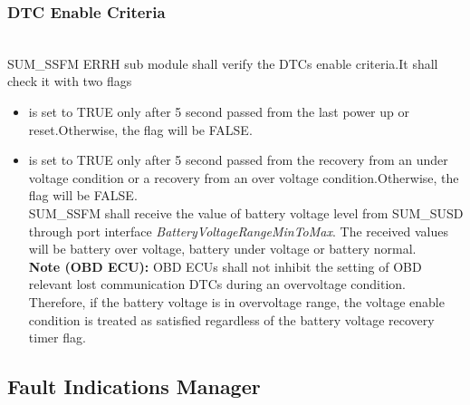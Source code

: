 \subsubsection{DTC Enable Criteria}
\\
\label{sec:DTCEnableCriteria}
SUM_SSFM ERRH sub module shall verify the DTCs enable criteria.It shall check it with two flags
\begin{itemize}
    \item {} is set to TRUE only after 5 second passed from the last power up or reset.Otherwise, the flag will be FALSE.
    \item {} is set to TRUE only after 5 second passed from the recovery from an under voltage condition or a recovery from an over voltage condition.Otherwise, the flag will be FALSE.\\
	SUM_SSFM shall receive the value of battery voltage level from SUM_SUSD through port interface \textit{BatteryVoltageRangeMinToMax}. The received values will be battery over voltage, battery under voltage or battery normal.\\
	\textbf{Note (OBD ECU):} OBD ECUs shall not inhibit the setting of OBD relevant lost communication DTCs during an overvoltage condition. Therefore, if the battery voltage is in overvoltage range, the voltage enable condition is treated as satisfied regardless of the battery voltage recovery timer flag.
\end{itemize}

{ }

\subsection{Fault Indications Manager}
\label{sec:FaultIndicationaDynamic}

